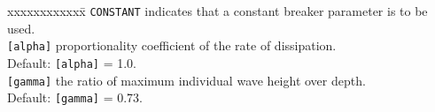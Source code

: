 \documentclass[12pt]{book}
\begin{document}
\begin{tabbing}
xxxxxxxxxxxx\= \kill
{\tt CONSTANT} \> indicates that a constant breaker parameter is to be used.\\
{\tt [alpha]}  \> proportionality coefficient of the rate of dissipation.\+\\
                  Default: {\tt [alpha]} = 1.0.\-\\
{\tt [gamma]}  \> the ratio of maximum individual wave height over depth.\+\\
                  Default: {\tt [gamma]} = 0.73.\-\\

\end{tabbing}
\end{document}
